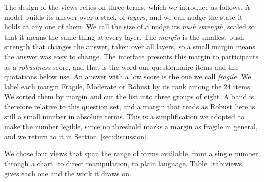 \documentclass[sigconf]{acmart}
\begin{document}
The design of the views relies on three terms, which we introduce as follows. A model builds its answer over a
stack of \emph{layers}, and we can nudge the state it holds at any one of them. We call the size of a nudge its
\emph{push strength}, scaled so that it means the same thing at every layer. The \emph{margin} is the smallest
push strength that changes the answer, taken over all layers, so a small margin means the answer was easy to
change. The interface presents this margin to participants as a \emph{robustness} score, and that is the word
our questionnaire items and the quotations below use. An answer with a low score is the one we call
\emph{fragile}. We label each margin Fragile, Moderate or Robust by its rank among the 24 items. We sorted them
by margin and cut the list into three groups of eight. A band is therefore relative to this question set, and a
margin that reads as Robust here is still a small number in absolute terms. This is a simplification we adopted
to make the number legible, since no threshold marks a margin as fragile in general, and we return to it in
Section~\ref{sec:discussion}.

We chose four views that span the range of forms available, from a single number, through a chart, to direct
manipulation, to plain language. Table~\ref{tab:views} gives each one and the work it draws on.
\end{document}
